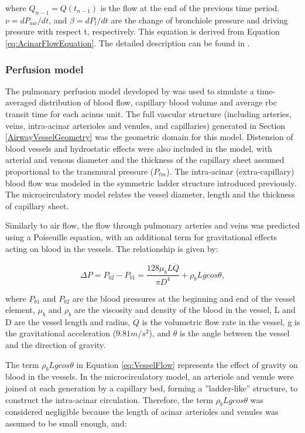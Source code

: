 \noindent where $Q_{n-1} = Q(t_{n-1})$ is the flow at the end of the previous time period. $\nu = dP_{aw}/dt$, and $\beta = dP_l/dt$ are the change of bronchiole pressure and driving pressure with respect t, respectively. This equation is derived from Equation \ref{eq:AcinarFlowEquation}. The detailed description can be found in \cite{swan2012computational}.

\subsubsection{Perfusion model}
The pulmonary perfusion model developed by \cite{clark2011interdependent} was used to simulate a time-averaged distribution of blood flow, capillary blood volume and average \gls{rbc} transit time for each acinus unit. The full vascular structure (including arteries, veins, intra-acinar arterioles and venules, and capillaries) generated in Section \ref{AirwayVesselGeometry} was the geometric domain for this model. Distension of blood vessels and hydrostatic effects were also included in the model, with arterial and venous diameter and the thickness of the capillary sheet assumed proportional to the transmural pressure ($P_{tm}$). The intra-acinar (extra-capillary) blood flow was modeled in the symmetric ladder structure introduced previously. The microcirculatory model relates the vessel diameter, length and the thickness of capillary sheet.

Similarly to air flow, the flow through pulmonary arteries and veins was predicted using a Poiseuille equation, with an additional term for gravitational effects acting on blood in the vessels. The relationship is given by:

\begin{equation}
 \label{eq:VesselFlow}
 \Delta P = P_{b2} - P_{b1} = \frac{128 \mu_bL\dot{Q}}{\pi D^{4}} + \rho_b Lgcos\theta,
\end{equation}

\noindent where $P_{b1}$ and $P_{b2}$ are the blood pressures at the beginning and end of the vessel element, $\mu_b$ and $\rho_b$ are the viscosity and density of the blood in the vessel, L and D are the vessel length and radius, $\dot{Q}$ is the volumetric flow rate in the vessel, g is the gravitational acceleration ($9.81m/s^2$), and $\theta$ is the angle between the vessel and the direction of gravity. 

The term $\rho_b Lgcos\theta$ in Equation \ref{eq:VesselFlow} represents the effect of gravity on blood in the vessels. In the microcirculatory model, an arteriole and venule were joined at each generation by a capillary bed, forming a ''ladder-like'' structure, to construct the intra-acinar circulation. Therefore, the term $\rho_b Lgcos\theta$ was considered negligible because the length of acinar arterioles and venules was assumed to be small enough, and:

